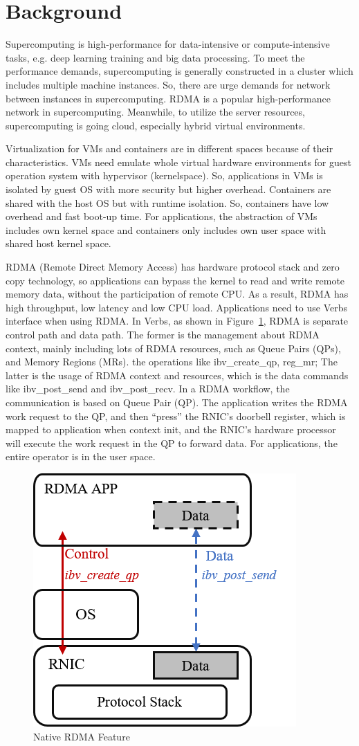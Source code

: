 \section{Background}
Supercomputing is high-performance for data-intensive or compute-intensive tasks, e.g. deep learning training and big data processing. To meet the performance demands, supercomputing is generally constructed in a cluster which includes multiple machine instances. So, there are urge demands for network between instances in supercomputing. RDMA is a popular high-performance network in supercomputing. Meanwhile, to utilize the server resources, supercomputing is going cloud, especially hybrid virtual environments.

Virtualization for VMs and containers are in different spaces because of their characteristics. VMs need emulate whole virtual hardware environments for guest operation system with hypervisor (kernelspace). So, applications in VMs is isolated by guest OS with more security but higher overhead. Containers are shared with the host OS but with runtime isolation. So, containers have low overhead and fast boot-up time. For applications, the abstraction of VMs includes own kernel space and containers only includes own user space with shared host kernel space.


RDMA (Remote Direct Memory Access) has hardware protocol stack and zero copy technology, so applications can bypass the kernel to read and write remote memory data, without the participation of remote CPU. As a result, RDMA has high throughput, low latency and low CPU load. Applications need to use Verbs interface when using RDMA. In Verbs, as shown in Figure~\ref{fig:rdma-feat}, RDMA is separate control path and data path. The former is the management about RDMA context, mainly including lots of RDMA resources, such as Queue Pairs (QPs), and Memory Regions (MRs). the operations like ibv\_create\_qp, reg\_mr; The latter is the usage of RDMA context and resources, which is the data commands like ibv\_post\_send and ibv\_post\_recv. In a RDMA workflow, the communication is based on Queue Pair (QP). The application writes the RDMA work request to the QP, and then ``press''  the RNIC's doorbell register, which is mapped to application when context init, and the RNIC's hardware processor will execute the work request in the QP to forward data. For applications, the entire operator is in the user space.

\begin{figure}[!ht]
	\centering
	\includegraphics[width=0.6\linewidth]{images/rdma-feat}
	\caption{Native RDMA Feature}
	\label{fig:rdma-feat}
\end{figure}


